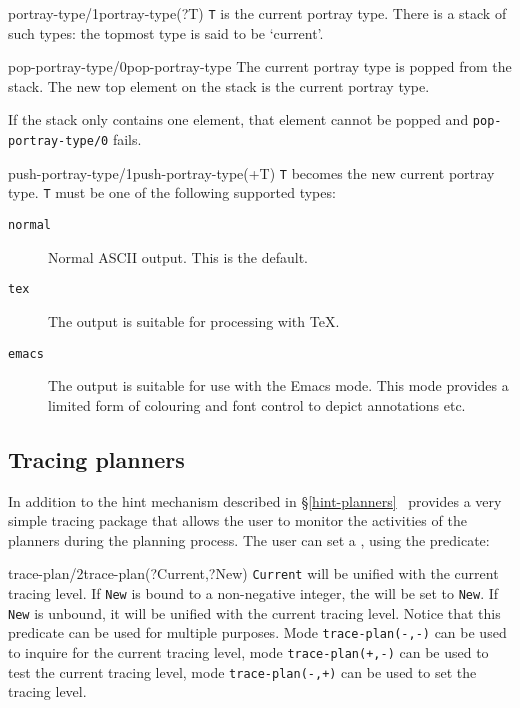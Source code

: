 \begin{predicate}{portray-type/1}{portray-type(?T)}%
{\tt T} is the current portray type.  There is a stack of such types:
the topmost type is said to be `current'.
\end{predicate}

\begin{predicate}{pop-portray-type/0}{pop-portray-type}%
The current portray type is popped from the stack.  The new top
element on the stack is the current portray type.

If the stack only contains one element, that element cannot be popped
and {\tt pop-portray-type/0} fails.
\end{predicate}

\begin{predicate}{push-portray-type/1}{push-portray-type(+T)}%
{\tt T} becomes the new current portray type.  {\tt T} must be one of
the following supported types:
\begin{description}
\item [{\tt normal}] Normal ASCII output.  This is the default.
\item [{\tt tex}] The output is suitable for processing with \TeX{}.
\item [{\tt emacs}] The output is suitable for use with the \clam
Emacs mode.  This mode provides a limited form of colouring and font
control to depict annotations etc.
\end{description}
\end{predicate}


\subsection {Tracing planners}
\label{tracing}
In addition to the hint mechanism described in \S\ref{hint-planners} 
\clam\ provides a very simple tracing package that allows the user to
monitor the activities of the planners during the planning process.
The user can set a , using the predicate:

\begin{predicate}{trace-plan/2}{trace-plan(?Current,?New)}%
{\tt Current} will be unified with the current tracing level.
If {\tt New} is bound to a non-negative integer, the 
will be set to {\tt New}. If {\tt New} is unbound, it will be unified
with the current tracing level. Notice that this predicate can be used
for multiple purposes. Mode {\tt trace-plan(-,-)} can be used to inquire for
the current tracing level, mode {\tt trace-plan(+,-)} can be used to test
the current tracing level, mode {\tt trace-plan(-,+)} can be used to set the
tracing level.
\end{predicate}

